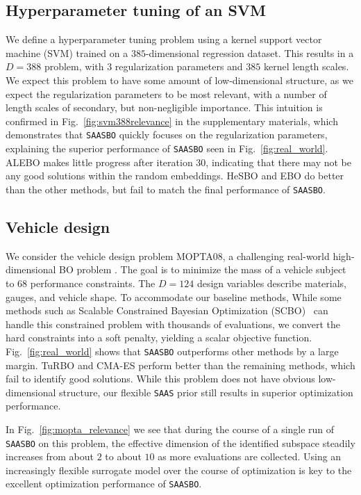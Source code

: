 \documentclass[accepted]{uai2021} %
\newcommand{\algoname}{{\texttt {SAASBO}}}
\newcommand{\priorname}{{\texttt {SAAS}}}
\begin{document}
\subsection{Hyperparameter tuning of an SVM}
\label{sec:sec_svm}
We define a hyperparameter tuning problem using a kernel support vector machine (SVM) trained
on a $385$-dimensional regression dataset.
This results in a $D=388$ problem, with $3$ regularization parameters and $385$
kernel length scales. We expect this problem to have some amount of low-dimensional structure,
as we expect the regularization parameters to be most relevant, with a number of
length scales of secondary, but non-negligible importance. This intuition
is confirmed in Fig.~\ref{fig:svm388relevance} in the supplementary materials, which demonstrates
that \algoname{} quickly focuses on the regularization parameters, explaining the superior performance of \algoname{} seen in Fig.~\ref{fig:real_world}.
ALEBO makes little progress after iteration $30$, indicating that there may not be any good solutions within the random embeddings.
HeSBO and EBO do better than the other methods, but fail to match the final performance of \algoname.


\subsection{Vehicle design}
\label{sec:sec_mopta08}
We consider the vehicle design problem MOPTA08, a challenging real-world high-dimensional BO problem \citep{jones2008large}.
The goal is to minimize the mass of a vehicle subject to $68$ performance constraints.
The $D=124$ design variables describe materials, gauges, and vehicle shape.
To accommodate our baseline methods,
While some methods such as Scalable Constrained Bayesian Optimization (SCBO)~\citep{eriksson2020scalable} can handle this constrained problem with thousands of evaluations,
we convert the hard constraints into a soft penalty, yielding a scalar objective function.
Fig.~\ref{fig:real_world} shows that \algoname{} outperforms other methods by a large margin.
TuRBO and CMA-ES perform better than the remaining methods, which fail to identify good solutions.
While this problem does not have obvious low-dimensional structure, our flexible \priorname{} prior still results in superior optimization performance.

In Fig.~\ref{fig:mopta_relevance} we see that during the course of a single run
of \algoname{} on this problem,
the effective dimension of the identified subspace steadily increases
from about $2$ to about $10$ as more evaluations are collected.
Using an increasingly flexible surrogate model over the course of
optimization is key to the excellent optimization performance of \algoname{}.
\end{document}
